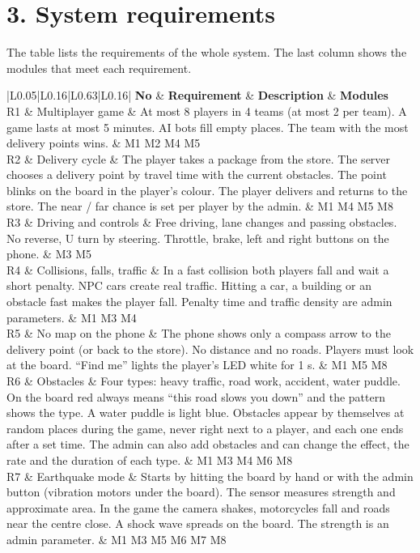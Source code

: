 \documentclass[
  english,
  10pt,
  a4paper,
]{article}
\newcommand{\ckkeep}[1]{\par\noindent\begin{minipage}{\linewidth}\setlength{\parskip}{4pt}#1\end{minipage}\par\smallskip}
\begin{document}
\section{3. System requirements}

\ckkeep{%
The table lists the requirements of the whole system. The last column shows the modules that meet
each requirement.

\begin{tabular}{|L{0.05}|L{0.16}|L{0.63}|L{0.16}|}
\hline \textbf{No} & \textbf{Requirement} & \textbf{Description} & \textbf{Modules} \\ \hline 
R1 & Multiplayer game & At most 8 players in 4 teams (at most 2 per team). A game lasts at most 5 minutes. AI bots fill empty places. The team with the most delivery points wins. & M1 M2 M4 M5 \\ \hline
R2 & Delivery cycle & The player takes a package from the store. The server chooses a delivery point by travel time with the current obstacles. The point blinks on the board in the player's colour. The player delivers and returns to the store. The near / far chance is set per player by the admin. & M1 M4 M5 M8 \\ \hline
R3 & Driving and controls & Free driving, lane changes and passing obstacles. No reverse, U turn by steering. Throttle, brake, left and right buttons on the phone. & M3 M5 \\ \hline
R4 & Collisions, falls, traffic & In a fast collision both players fall and wait a short penalty. NPC cars create real traffic. Hitting a car, a building or an obstacle fast makes the player fall. Penalty time and traffic density are admin parameters. & M1 M3 M4 \\ \hline
R5 & No map on the phone & The phone shows only a compass arrow to the delivery point (or back to the store). No distance and no roads. Players must look at the board. ``Find me'' lights the player's LED white for 1 s. & M1 M5 M8 \\ \hline
R6 & Obstacles & Four types: heavy traffic, road work, accident, water puddle. On the board red always means ``this road slows you down'' and the pattern shows the type. A water puddle is light blue. Obstacles appear by themselves at random places during the game, never right next to a player, and each one ends after a set time. The admin can also add obstacles and can change the effect, the rate and the duration of each type. & M1 M3 M4 M6 M8 \\ \hline
R7 & Earthquake mode & Starts by hitting the board by hand or with the admin button (vibration motors under the board). The sensor measures strength and approximate area. In the game the camera shakes, motorcycles fall and roads near the centre close. A shock wave spreads on the board. The strength is an admin parameter. & M1 M3 M5 M6 M7 M8 \\ \hline

\end{tabular}}
\end{document}
